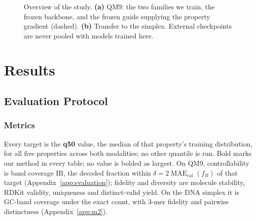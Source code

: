 \documentclass{article}
\newcommand{\IB}{\mathrm{IB}}
\begin{document}
\begin{figure}[!t]
\caption{Overview of the study. \textbf{(a)} QM9: the two families we train, the frozen backbone, and the frozen guide supplying the property gradient (dashed). \textbf{(b)} Transfer to the simplex. External checkpoints are never pooled with models trained here.}
\label{fig:overview}
\end{figure}

\section{Results}
\subsection{Evaluation Protocol}\label{sec:protocol}
\subsubsection{Metrics}
Every target is the \textbf{q50} value, the median of that property's training distribution, for all five properties across both modalities; no other quantile is run. Bold marks our method in every table; no value is bolded as largest. On QM9, controllability is band coverage $\IB$, the decoded fraction within $\delta=2\operatorname{MAE}_{\mathrm{cal}}(f_B)$ of that target (Appendix~\ref{app:evaluation}); fidelity and diversity are molecule stability, RDKit validity, uniqueness and distinct-valid yield. On the DNA simplex it is GC-band coverage under the exact count, with 3-mer fidelity and pairwise distinctness (Appendix~\ref{app:m2}).
\end{document}
